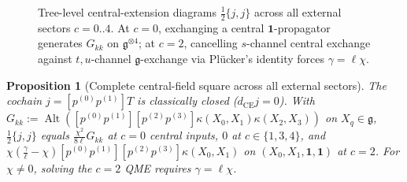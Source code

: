 \documentclass[11pt,letterpaper]{article}
\numberwithin{equation}{section}
\theoremstyle{plain}
\newtheorem{proposition}[theorem]{Proposition}
\theoremstyle{definition}
\theoremstyle{remark}
\newcommand{\fg}{\mathfrak{g}}
\newcommand{\Alt}{\operatorname{Alt}}
\begin{document}
\begin{figure}[H]
\caption{Tree-level central-extension diagrams $\frac{1}{2}\{j, j\}$ across all external sectors $c = 0..4$. At $c=0$, exchanging a central $\mathbf{1}$-propagator generates $G_{kk}$ on $\fg^{\otimes 4}$; at $c=2$, cancelling $s$-channel central exchange against $t,u$-channel $\fg$-exchange via Pl\"ucker's identity forces $\gamma = \ell\chi$.}
\label{fig:central-extension-sectors}
\end{figure}

\begin{proposition}[Complete central-field square across all external sectors]
\label{prop:central-square}
The cochain $j = [p^{(0)}p^{(1)}]T$ is classically closed ($d_{\mathrm{CE}}j = 0$). With $G_{kk} := \Alt([p^{(0)}p^{(1)}][p^{(2)}p^{(3)}]\kappa(X_0,X_1)\kappa(X_2,X_3))$ on $X_q \in \fg$, $\frac{1}{2}\{j, j\}$ equals $\frac{\chi^2}{8\ell}G_{kk}$ at $c = 0$ central inputs, $0$ at $c \in \{1,3,4\}$, and $\chi(\frac{\gamma}{\ell}-\chi)[p^{(0)}p^{(1)}][p^{(2)}p^{(3)}]\kappa(X_0,X_1)$ on $(X_0,X_1,\mathbf{1},\mathbf{1})$ at $c = 2$. For $\chi \neq 0$, solving the $c = 2$ QME requires $\gamma = \ell\chi$.
\end{proposition}
\end{document}
